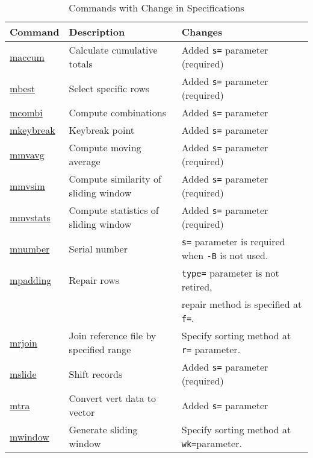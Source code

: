 \begin{table}[!htbp]
\begin{center}
\caption{Commands with Change in Specifications \label{tbl:changed_commands}}
{\small
  \begin{tabular}{l|l|l} \hline
Command                             & Description               & Changes \\ \hline
\hyperref[sect:maccum]{maccum}       & Calculate cumulative totals           & Added \verb|s=| parameter (required) \\
\hyperref[sect:mbest]{mbest}         & Select specific rows       & Added \verb|s=| parameter (required) \\
\hyperref[sect:mcombi]{mcombi}       & Compute combinations         & Added \verb|s=| parameter \\
\hyperref[sect:mkeybreak]{mkeybreak} & Keybreak point   & Added \verb|s=| parameter \\
\hyperref[sect:mmvavg]{mmvavg}       & Compute moving average     & Added \verb|s=| parameter (required) \\
\hyperref[sect:mmvsim]{mmvsim}       & Compute similarity of sliding window & Added \verb|s=| parameter (required) \\
\hyperref[sect:mmvstats]{mmvstats}   & Compute statistics of sliding window & Added \verb|s=| parameter (required) \\
\hyperref[sect:mnumber]{mnumber}     & Serial number              & \verb|s=| parameter is required when \verb|-B| is not used.  \\
\hyperref[sect:mpadding]{mpadding}   & Repair rows     &  \verb|type=| parameter is not retired, \\
                                     &                    & repair method is specified at \verb|f=|. \\
\hyperref[sect:mrjoin]{mrjoin}       & Join reference file by specified range & Specify sorting method at  \verb|r=| parameter.  \\
\hyperref[sect:mslide]{mslide}       & Shift records            & Added \verb|s=| parameter (required) \\
\hyperref[sect:mtra]{mtra}           & Convert vert data to vector  & Added \verb|s=| parameter \\
\hyperref[sect:mwindow]{mwindow}     & Generate sliding window   & Specify sorting method at \verb|wk=|parameter. \\

\hline
  \end{tabular}
  }
  \end{center}
\end{table}

